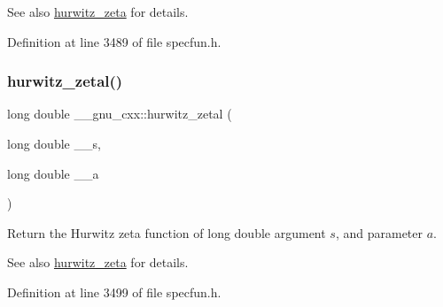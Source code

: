 \begin{DoxySeeAlso}{See also}
\hyperlink{group__gnu__math__spec__func_ga7b167ce1c8d9aa6aad40fc83a95733bd}{hurwitz\+\_\+zeta} for details. 
\end{DoxySeeAlso}


Definition at line 3489 of file specfun.\+h.

\mbox{\label{group__gnu__math__spec__func_gad8f2cfc7e198755968bae35d46b49d5a}} 
\subsubsection{\texorpdfstring{hurwitz\+\_\+zetal()}{hurwitz\_zetal()}}
{\footnotesize\ttfamily long double \+\_\+\+\_\+gnu\+\_\+cxx\+::hurwitz\+\_\+zetal (\begin{DoxyParamCaption}\item[{long double}]{\+\_\+\+\_\+s,  }\item[{long double}]{\+\_\+\+\_\+a }\end{DoxyParamCaption})\hspace{0.3cm}{\ttfamily [inline]}}

Return the Hurwitz zeta function of {\ttfamily long double} argument $ s $, and parameter $ a $.

\begin{DoxySeeAlso}{See also}
\hyperlink{group__gnu__math__spec__func_ga7b167ce1c8d9aa6aad40fc83a95733bd}{hurwitz\+\_\+zeta} for details. 
\end{DoxySeeAlso}


Definition at line 3499 of file specfun.\+h.

\mbox{\label{group__gnu__math__spec__func_ga374198e4076f9e23f3878ca3af70e6da}} 
